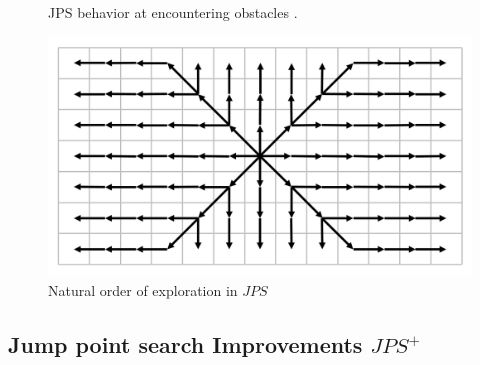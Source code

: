 \documentclass{article}
\begin{document}
    \begin{figure}[!htb]
        \centering
        \hfill
        \caption{JPS behavior at encountering obstacles \cite{JPSexplained}.}
    \end{figure}

    \begin{figure}[!htb]
        \centering
        \includegraphics[width=\textwidth]{figures/jps_strategy.png}
        \caption{Natural order of exploration in $JPS$}
        \label{fig:pathorder}
    \end{figure}



    \subsection{Jump point search Improvements $JPS^+$}
\end{document}
